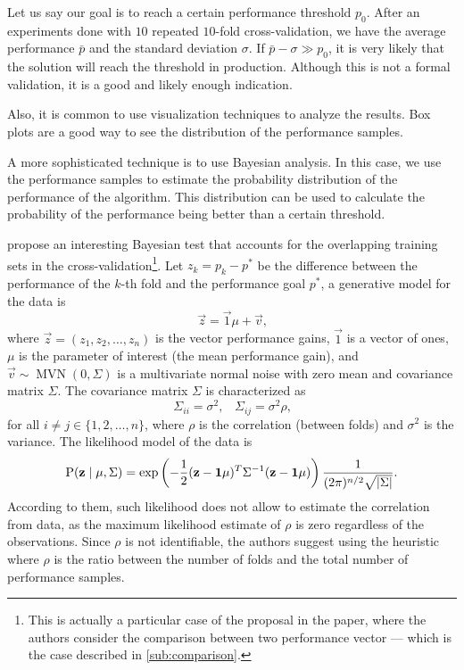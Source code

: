 Let us say our goal is to reach a certain performance threshold $p_0$.  After an
experiments done with $10$ repeated $10$-fold cross-validation, we have the average
performance $\bar{p}$ and the standard deviation $\sigma$.  If $\bar{p} - \sigma \gg
p_0$, it is very likely that the solution will reach the threshold in production.
Although this is not a formal validation, it is a good and likely enough indication.

Also, it is common to use visualization techniques to analyze the results.  Box plots are
a good way to see the distribution of the performance samples.

A more sophisticated technique is to use Bayesian analysis.  In this case, we use the
performance samples to estimate the probability distribution of the performance of the
algorithm.  This distribution can be used to calculate the probability of the performance
being better than a certain threshold.

\textcite{Benavoli2017} propose an interesting Bayesian test that accounts for the
overlapping training sets in the cross-validation\footnote{%
This is actually a particular case of the proposal in the paper, where the authors
consider the comparison between two performance vector --- which is the case described in
\cref{sub:comparison}.}.
Let $z_k = p_k - p^{*}$ be the
difference between the performance of the $k$-th fold and the performance goal $p^{*}$,
a generative model for the data is
\begin{equation*}
  \vec{z} = \vec{1}\mu + \vec{v}\text{,}
\end{equation*}
where $\vec{z} = (z_1, z_2, \ldots, z_n)$ is the vector performance gains, $\vec{1}$ is a
vector of ones, $\mu$ is the parameter of interest (the mean performance gain), and
$\vec{v} \sim \operatorname{MVN}(0, \Sigma)$ is a multivariate normal noise with zero mean
and covariance matrix $\Sigma$.  The covariance matrix $\Sigma$ is characterized as
\begin{equation*}
  \Sigma_{ii} = \sigma^2\text{,}\quad
  \Sigma_{ij} = \sigma^2\rho\text{,}
\end{equation*}
for all $i \neq j \in \{1, 2, \ldots, n\}$, where $\rho$ is the correlation (between folds)
and $\sigma^2$ is the variance.  The likelihood model of the data is
\begin{equation*}
  \operatorname{P}(\mathbf{z} \mid \mu, \Sigma) =
    \exp\left(-\frac{1}{2}(\mathbf{z} - \mathbf{1}\mu)^T \Sigma^{-1} (\mathbf{z} - \mathbf{1}\mu)\right)
    \frac{1}{(2\pi)^{n/2} \sqrt{\lvert \Sigma \rvert}}\text{.}
\end{equation*}
According to them, such likelihood does not allow to estimate the correlation from data,
as the maximum likelihood estimate of $\rho$ is zero regardless of the observations.
Since $\rho$ is not identifiable, the authors suggest using the heuristic where $\rho$ is
the ratio between the number of folds and the total number of performance samples.

